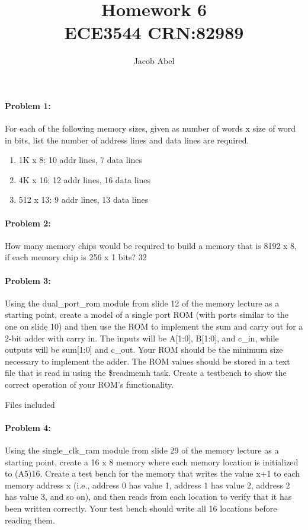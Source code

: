 \documentclass[12pt,letterpaper,titlepage]{article}
\author{Jacob Abel}
\title{	Homework 6
	\\\large ECE3544 CRN:82989
}
\begin{document}
\maketitle
\begin{raggedright} 
\paragraph{Problem 1: }
For each of the following memory sizes, given as number of words x size of word in bits,
list the number of address lines and data lines are required.
\begin{enumerate}
\item 1K x 8: 10 addr lines, 7 data lines
\item 4K x 16: 12 addr lines, 16 data lines
\item 512 x 13: 9 addr lines, 13 data lines
\end{enumerate}

\paragraph{Problem 2: }
How many memory chips would be required to build a memory that is 8192 x 8, if each
memory chip is 256 x 1 bits? 32

\paragraph{Problem 3: }
Using the dual\_port\_rom module from slide 12 of the memory lecture as a starting point,
create a model of a single port ROM (with ports similar to the one on slide 10) and then use the
ROM to implement the sum and carry out for a 2-bit adder with carry in. The inputs will be
A[1:0], B[1:0], and c\_in, while outputs will be sum[1:0] and c\_out. Your ROM should be the
minimum size necessary to implement the adder. The ROM values should be stored in a text file
that is read in using the \$readmemh task. Create a testbench to show the correct operation of
your ROM's functionality.

Files included

\paragraph{Problem 4: }
Using the single\_clk\_ram module from slide 29 of the memory lecture as a starting point,
create a 16 x 8 memory where each memory location is initialized to (A5)16. Create a test bench
for the memory that writes the value x+1 to each memory address x (i.e., address 0 has value 1,
address 1 has value 2, address 2 has value 3, and so on), and then reads from each location to
verify that it has been written correctly. Your test bench should write all 16 locations before
reading them.


\end{raggedright}
\end{document}
